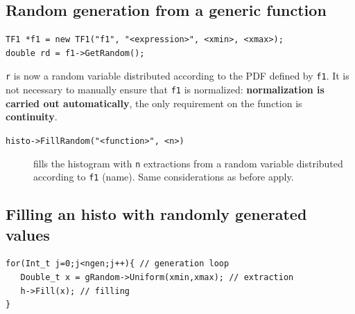 \documentclass[10pt, oneside]{article}
\begin{document}
\subsection{Random generation from a generic function}
\begin{verbatim}
TF1 *f1 = new TF1("f1", "<expression>", <xmin>, <xmax>);
double rd = f1->GetRandom();
\end{verbatim}
\texttt{r} is now a random variable distributed according to the PDF defined by \texttt{f1}. It is not necessary to manually ensure that \texttt{f1} is normalized: \textbf{normalization is carried out automatically}, the only requirement on the function is \textbf{continuity}.
\begin{description}
\item[\texttt{histo->FillRandom("<function>", <n>)}] fills the histogram with \texttt{n} extractions from a random variable distributed according to \texttt{f1} (name). Same considerations as before apply.
\end{description}
\subsection{Filling an histo with randomly generated values}
\begin{verbatim}
for(Int_t j=0;j<ngen;j++){ // generation loop
   Double_t x = gRandom->Uniform(xmin,xmax); // extraction
   h->Fill(x); // filling
}
\end{verbatim}
\end{document}
